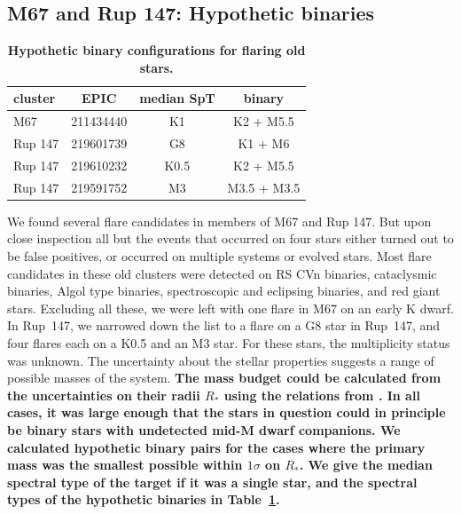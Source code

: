 \documentclass{aa}
\begin{document}
\subsection{M67 and Rup 147: Hypothetic binaries}
\begin{table}

\caption{\textbf{Hypothetic binary configurations for flaring old stars.}}
\label{tab:m67_rup147_binaries}
\centering
\begin{tabular}{lccc}
\hline
 cluster & EPIC & median SpT &     binary \\
\hline
     M67 &  211434440 &         K1 &    K2 + M5.5 \\
 Rup 147 &  219601739 &         G8 &      K1 + M6 \\
 Rup 147 &  219610232 &       K0.5 &    K2 + M5.5 \\
 Rup 147 &  219591752 &         M3 &  M3.5 + M3.5 \\
\hline
\end{tabular}
\end{table}
We found several flare candidates in members of M67 and Rup 147. But upon close inspection all but the events that occurred on four stars either turned out to be false positives, or occurred on multiple systems or evolved stars. Most flare candidates in these old clusters were detected on RS CVn binaries, cataclysmic binaries, Algol type binaries, spectroscopic and eclipsing binaries, and red giant stars. Excluding all these, we were left with one flare in M67 on an early K dwarf. In Rup~147, we narrowed down the list to a flare on a G8 star in Rup~147, and four flares each on a K0.5 and an M3 star. For these stars, the multiplicity status was unknown. The uncertainty about the stellar properties suggests a range of possible masses of the system. \textbf{The mass budget could be calculated from the uncertainties on their radii $R_*$ using the relations from \citet{eker2018}. In all cases, it was large enough that the stars in question could in principle be binary stars with undetected mid-M dwarf companions. We calculated hypothetic binary pairs for the cases where the primary mass was the smallest possible within $1\sigma$ on $R_*$. We give the median spectral type of the target if it was a single star, and the spectral types of the hypothetic binaries in Table~\ref{tab:m67_rup147_binaries}.}
\end{document}
